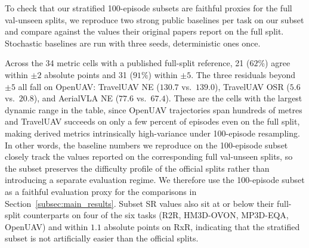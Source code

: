 \documentclass[conference]{IEEEtran}
\begin{document}
To check that our stratified 100-episode subsets are faithful proxies for the
full val-unseen splits, we reproduce two strong public baselines per task on
our subset and compare against the values their original papers report on the
full split. Stochastic baselines are run with three seeds, deterministic ones
once.

Across the 34 metric cells with a published full-split reference, 21 ($62\%$)
agree within $\pm 2$ absolute points and 31 ($91\%$) within $\pm 5$. The three
residuals beyond $\pm 5$ all fall on OpenUAV: TravelUAV NE ($130.7$ vs.\
$139.0$), TravelUAV OSR ($5.6$ vs.\ $20.8$), and AerialVLA NE ($77.6$ vs.\
$67.4$). These are the cells with the largest dynamic range in the table,
since OpenUAV trajectories span hundreds of metres and TravelUAV succeeds on
only a few percent of episodes even on the full split, making derived metrics
intrinsically high-variance under 100-episode resampling. In other words, the
baseline numbers we reproduce on the 100-episode subset closely track the
values reported on the corresponding full val-unseen splits, so the subset
preserves the difficulty profile of the official splits rather than
introducing a separate evaluation regime. We therefore use the 100-episode
subset as a faithful evaluation proxy for the comparisons in
Section~\ref{subsec:main_results}. Subset SR values also sit at or below their
full-split counterparts on four of the six tasks (R2R, HM3D-OVON, MP3D-EQA,
OpenUAV) and within $1.1$ absolute points on RxR, indicating that the
stratified subset is not artificially easier than the official splits.
\end{document}
